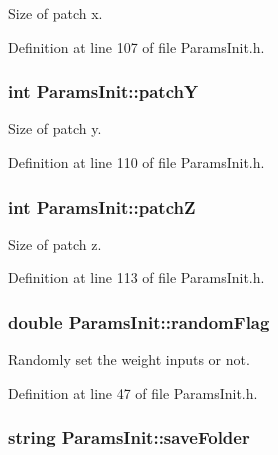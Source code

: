 Size of patch x. 



Definition at line 107 of file Params\+Init.\+h.

\subsubsection[{\texorpdfstring{patchY}{patchY}}]{\setlength{\rightskip}{0pt plus 5cm}int Params\+Init\+::patchY}\hypertarget{classParamsInit_a8949fa6f3429556f98e9b977ba357544}{}\label{classParamsInit_a8949fa6f3429556f98e9b977ba357544}


Size of patch y. 



Definition at line 110 of file Params\+Init.\+h.

\subsubsection[{\texorpdfstring{patchZ}{patchZ}}]{\setlength{\rightskip}{0pt plus 5cm}int Params\+Init\+::patchZ}\hypertarget{classParamsInit_adfec2a432494a34c90f46c145f9097b8}{}\label{classParamsInit_adfec2a432494a34c90f46c145f9097b8}


Size of patch z. 



Definition at line 113 of file Params\+Init.\+h.

\subsubsection[{\texorpdfstring{random\+Flag}{randomFlag}}]{\setlength{\rightskip}{0pt plus 5cm}double Params\+Init\+::random\+Flag}\hypertarget{classParamsInit_a5583548cf1c2400d0e6260fc5f757957}{}\label{classParamsInit_a5583548cf1c2400d0e6260fc5f757957}


Randomly set the weight inputs or not. 



Definition at line 47 of file Params\+Init.\+h.

\subsubsection[{\texorpdfstring{save\+Folder}{saveFolder}}]{\setlength{\rightskip}{0pt plus 5cm}string Params\+Init\+::save\+Folder}\hypertarget{classParamsInit_a105b1ccbe7c5b4cc1ff8b2484f960353}{}\label{classParamsInit_a105b1ccbe7c5b4cc1ff8b2484f960353}


